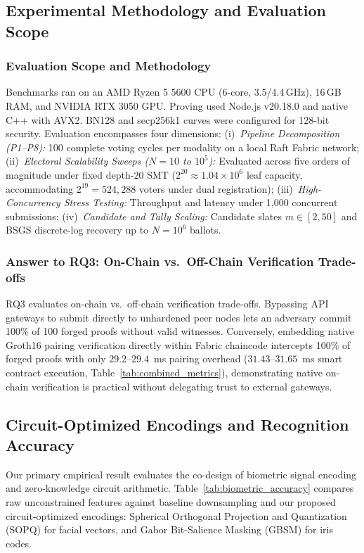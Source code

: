 \documentclass[10pt,letterpaper,journal]{IEEEtran}
\begin{document}
\subsection{Experimental Methodology and Evaluation Scope}

\subsubsection{Evaluation Scope and Methodology}
Benchmarks ran on an AMD Ryzen 5 5600 CPU (6-core, 3.5/4.4\,GHz), 16\,GB RAM, and NVIDIA RTX 3050 GPU. Proving used Node.js v20.18.0 and native C++ with AVX2. BN128 and secp256k1 curves were configured for 128-bit security. Evaluation encompasses four dimensions:
(i)~\emph{Pipeline Decomposition (P1--P8):} 100 complete voting cycles per modality on a local Raft Fabric network;
(ii)~\emph{Electoral Scalability Sweeps ($N=10$ to $10^5$):} Evaluated across five orders of magnitude under fixed depth-$20$ SMT ($2^{20} \approx 1.04\times 10^6$ leaf capacity, accommodating $2^{19} = 524{,}288$ voters under dual registration);
(iii)~\emph{High-Concurrency Stress Testing:} Throughput and latency under 1,000 concurrent submissions;
(iv)~\emph{Candidate and Tally Scaling:} Candidate slates $m \in [2, 50]$ and BSGS discrete-log recovery up to $N=10^6$ ballots.

\subsubsection{Answer to RQ3: On-Chain vs.\ Off-Chain Verification Trade-offs}
RQ3 evaluates on-chain vs.\ off-chain verification trade-offs. Bypassing API gateways to submit directly to unhardened peer nodes lets an adversary commit 100\% of 100 forged proofs without valid witnesses. Conversely, embedding native Groth16 pairing verification directly within Fabric chaincode intercepts 100\% of forged proofs with only $29.2$--$29.4$~ms pairing overhead ($31.43$--$31.65$~ms smart contract execution, Table~\ref{tab:combined_metrics}), demonstrating native on-chain verification is practical without delegating trust to external gateways.


\subsection{Circuit-Optimized Encodings and Recognition Accuracy}
\label{subsec:eval_encoding}

Our primary empirical result evaluates the co-design of biometric signal encoding and zero-knowledge circuit arithmetic. Table~\ref{tab:biometric_accuracy} compares raw unconstrained features against baseline downsampling and our proposed circuit-optimized encodings: Spherical Orthogonal Projection and Quantization (SOPQ) for facial vectors, and Gabor Bit-Salience Masking (GBSM) for iris codes.
\end{document}
